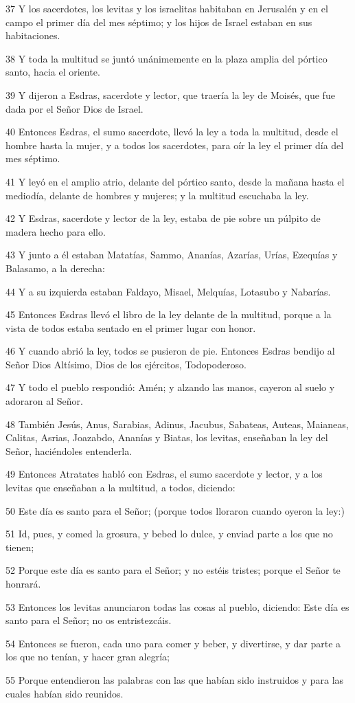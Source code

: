 \par 37 Y los sacerdotes, los levitas y los israelitas habitaban en Jerusalén y en el campo el primer día del mes séptimo; y los hijos de Israel estaban en sus habitaciones.
\par 38 Y toda la multitud se juntó unánimemente en la plaza amplia del pórtico santo, hacia el oriente.
\par 39 Y dijeron a Esdras, sacerdote y lector, que traería la ley de Moisés, que fue dada por el Señor Dios de Israel.
\par 40 Entonces Esdras, el sumo sacerdote, llevó la ley a toda la multitud, desde el hombre hasta la mujer, y a todos los sacerdotes, para oír la ley el primer día del mes séptimo.
\par 41 Y leyó en el amplio atrio, delante del pórtico santo, desde la mañana hasta el mediodía, delante de hombres y mujeres; y la multitud escuchaba la ley.
\par 42 Y Esdras, sacerdote y lector de la ley, estaba de pie sobre un púlpito de madera hecho para ello.
\par 43 Y junto a él estaban Matatías, Sammo, Ananías, Azarías, Urías, Ezequías y Balasamo, a la derecha:
\par 44 Y a su izquierda estaban Faldayo, Misael, Melquías, Lotasubo y Nabarías.
\par 45 Entonces Esdras llevó el libro de la ley delante de la multitud, porque a la vista de todos estaba sentado en el primer lugar con honor.
\par 46 Y cuando abrió la ley, todos se pusieron de pie. Entonces Esdras bendijo al Señor Dios Altísimo, Dios de los ejércitos, Todopoderoso.
\par 47 Y todo el pueblo respondió: Amén; y alzando las manos, cayeron al suelo y adoraron al Señor.
\par 48 También Jesús, Anus, Sarabias, Adinus, Jacubus, Sabateas, Auteas, Maianeas, Calitas, Asrias, Joazabdo, Ananías y Biatas, los levitas, enseñaban la ley del Señor, haciéndoles entenderla.
\par 49 Entonces Atratates habló con Esdras, el sumo sacerdote y lector, y a los levitas que enseñaban a la multitud, a todos, diciendo:
\par 50 Este día es santo para el Señor; (porque todos lloraron cuando oyeron la ley:)
\par 51 Id, pues, y comed la grosura, y bebed lo dulce, y enviad parte a los que no tienen;
\par 52 Porque este día es santo para el Señor; y no estéis tristes; porque el Señor te honrará.
\par 53 Entonces los levitas anunciaron todas las cosas al pueblo, diciendo: Este día es santo para el Señor; no os entristezcáis.
\par 54 Entonces se fueron, cada uno para comer y beber, y divertirse, y dar parte a los que no tenían, y hacer gran alegría;
\par 55 Porque entendieron las palabras con las que habían sido instruidos y para las cuales habían sido reunidos.

